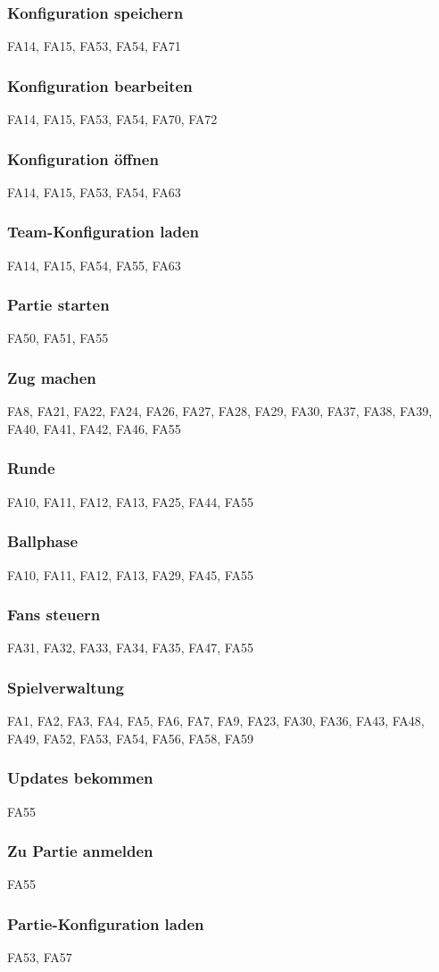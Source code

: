\subsubsection{Konfiguration speichern}
FA14,
FA15, 
FA53, 
FA54, 
FA71

\subsubsection{Konfiguration bearbeiten}
FA14,
FA15, 
FA53, 
FA54, 
FA70, 
FA72

\subsubsection{Konfiguration öffnen}
FA14,
FA15, 
FA53, 
FA54, 
FA63

\subsubsection{Team-Konfiguration laden}
FA14,
FA15, 
FA54, 
FA55, 
FA63

\subsubsection{Partie starten}
FA50,
FA51, 
FA55

\subsubsection{Zug machen}
FA8,
FA21, 
FA22, 
FA24, 
FA26, 
FA27, 
FA28, 
FA29, 
FA30, 
FA37, 
FA38, 
FA39, 
FA40, 
FA41, 
FA42, 
FA46, 
FA55

\subsubsection{Runde}
FA10,
FA11, 
FA12, 
FA13, 
FA25, 
FA44, 
FA55

\subsubsection{Ballphase}
FA10,
FA11, 
FA12, 
FA13, 
FA29, 
FA45, 
FA55 

\subsubsection{Fans steuern}
FA31,
FA32, 
FA33, 
FA34, 
FA35, 
FA47, 
FA55 

\subsubsection{Spielverwaltung}
FA1,
FA2, 
FA3, 
FA4, 
FA5, 
FA6, 
FA7, 
FA9, 
FA23, 
FA30, 
FA36, 
FA43, 
FA48, 
FA49, 
FA52, 
FA53, 
FA54, 
FA56, 
FA58, 
FA59 

\subsubsection{Updates bekommen}
FA55

\subsubsection{Zu Partie anmelden}
FA55

\subsubsection{Partie-Konfiguration laden}
FA53,
FA57
